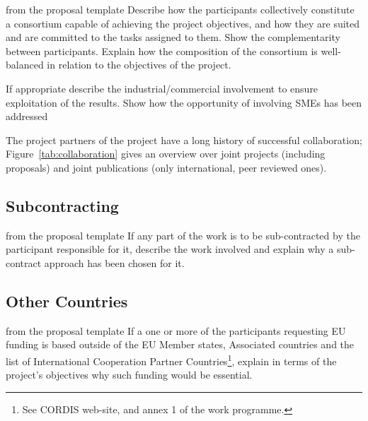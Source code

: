 \begin{todo}{from the proposal template}
  Describe how the participants collectively constitute a consortium capable of achieving
  the project objectives, and how they are suited and are committed to the tasks assigned
  to them. Show the complementarity between participants. Explain how the composition of
  the consortium is well-balanced in relation to the objectives of the project.  

  If appropriate describe the industrial/commercial involvement to ensure exploitation of
  the results. Show how the opportunity of involving SMEs has been addressed
\end{todo}

The project partners of the \pn project have a long history of successful collaboration;
Figure~\ref{tab:collaboration} gives an overview over joint projects (including proposals) and
joint publications (only international, peer reviewed ones).

% 
\coherencetable

\subsection{Subcontracting}\label{sec:subcontracting}
\begin{todo}{from the proposal template}
  If any part of the work is to be sub-contracted by the participant responsible for it,
  describe the work involved and explain why a sub-contract approach has been chosen for
  it.
\end{todo}


\subsection{Other Countries}\label{sec:other-countries}
\begin{todo}{from the proposal template}
  If a one or more of the participants requesting EU funding is based outside of the EU
  Member states, Associated countries and the list of International Cooperation Partner
  Countries\footnote{See CORDIS web-site, and annex 1 of the work programme.}, explain in
  terms of the project’s objectives why such funding would be essential.
\end{todo}

